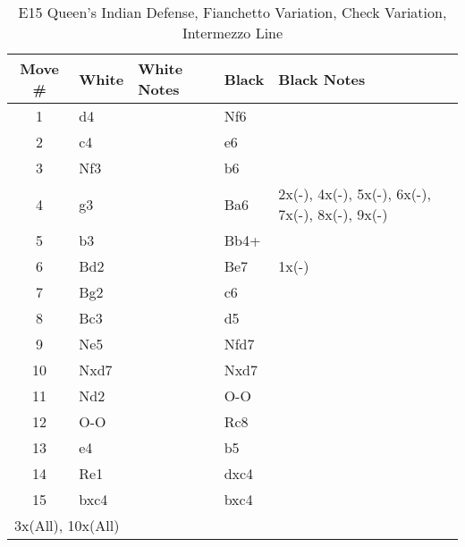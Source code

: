 \begin{table}[htbp]
\centering
\scriptsize
\caption[]{E15 Queen's Indian Defense, Fianchetto Variation, Check Variation, Intermezzo Line}
\begin{tabular}{|c|l|p{5cm}|l|p{5cm}|}
\hline
\textbf{Move \#} & \textbf{White} & \textbf{White Notes} & \textbf{Black} & \textbf{Black Notes} \\
\hline
1  & d4    &                     & Nf6    &                        \\
2  & c4    &                     & e6     &                        \\
3  & Nf3   &                     & b6     &                        \\
4  & g3    &                     & Ba6    & 2x(-), 4x(-), 5x(-), 6x(-), 7x(-), 8x(-), 9x(-) \\
5  & b3    &                     & Bb4+   &                        \\
6  & Bd2   &                     & Be7    & 1x(-)                  \\
7  & Bg2   &                     & c6     &                        \\
8  & Bc3   &                     & d5     &                        \\
9  & Ne5   &                     & Nfd7   &                        \\
10 & Nxd7  &                     & Nxd7   &                        \\
11 & Nd2   &                     & O-O    &                        \\
12 & O-O   &                     & Rc8    &                        \\
13 & e4    &                     & b5     &                        \\
14 & Re1   &                     & dxc4   &                        \\
15 & bxc4  &                     & bxc4   &                        \\
\hline
\multicolumn{5}{|l|}{3x(All), 10x(All)} \\
\hline
\end{tabular}
\end{table}


